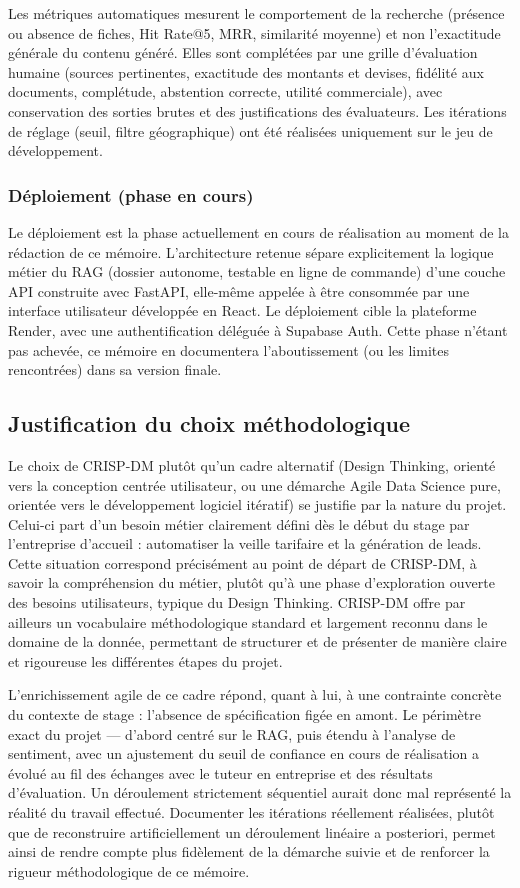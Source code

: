 Les métriques automatiques mesurent le comportement de la recherche (présence ou absence de fiches,
Hit Rate@5, MRR, similarité moyenne) et non l'exactitude générale du contenu généré. Elles sont
complétées par une grille d'évaluation humaine (sources pertinentes, exactitude des montants et devises,
fidélité aux documents, complétude, abstention correcte, utilité commerciale), avec conservation des
sorties brutes et des justifications des évaluateurs. Les itérations de réglage (seuil, filtre
géographique) ont été réalisées uniquement sur le jeu de développement.

\subsubsection{Déploiement (phase en cours)}

Le déploiement est la phase actuellement en cours de réalisation au moment de la rédaction de ce mémoire.
L'architecture retenue sépare explicitement la logique métier du RAG (dossier autonome, testable en ligne de
commande) d'une couche API construite avec FastAPI, elle-même appelée à être consommée par une interface
utilisateur développée en React. Le déploiement cible la plateforme Render, avec une authentification
déléguée à Supabase Auth. Cette phase n'étant pas achevée, ce mémoire en documentera l'aboutissement (ou les
limites rencontrées) dans sa version finale.

\subsection{Justification du choix méthodologique}

Le choix de CRISP-DM plutôt qu’un cadre alternatif (Design Thinking, orienté vers la conception centrée utilisateur, ou une démarche Agile Data Science pure, orientée vers le développement logiciel itératif) se justifie par la nature du projet. Celui-ci part d’un besoin métier clairement défini dès le début du stage par l’entreprise d’accueil : automatiser la veille tarifaire et la génération de leads. Cette situation correspond précisément au point de départ de CRISP-DM, à savoir la compréhension du métier, plutôt qu’à une phase d’exploration ouverte des besoins utilisateurs, typique du Design Thinking. CRISP-DM offre par ailleurs un vocabulaire méthodologique standard et largement reconnu dans le domaine de la donnée, permettant de structurer et de présenter de manière claire et rigoureuse les différentes étapes du projet.

L’enrichissement agile de ce cadre répond, quant à lui, à une contrainte concrète du contexte de stage : l’absence de spécification figée en amont. Le périmètre exact du projet — d’abord centré sur le RAG, puis étendu à l’analyse de sentiment, avec un ajustement du seuil de confiance en cours de réalisation  a évolué au fil des échanges avec le tuteur en entreprise et des résultats d’évaluation. Un déroulement strictement séquentiel aurait donc mal représenté la réalité du travail effectué. Documenter les itérations réellement réalisées, plutôt que de reconstruire artificiellement un déroulement linéaire a posteriori, permet ainsi de rendre compte plus fidèlement de la démarche suivie et de renforcer la rigueur méthodologique de ce mémoire.

